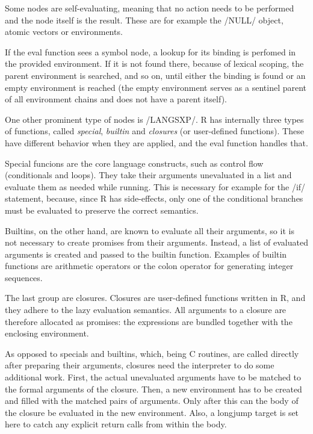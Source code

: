 {Some nodes are self-evaluating, meaning that no action needs to be performed and the node itself is the result. These are for example the \rinline/NULL/ object, atomic vectors or environments.

If the eval function sees a symbol node, a lookup for its binding is perfomed in the provided environment. If it is not found there, because of lexical scoping, the parent environment is searched, and so on, until either the binding is found or an empty environment is reached (the empty environment serves as a sentinel parent of all environment chains and does not have a parent itself).

One other prominent type of nodes is \cinline/LANGSXP/. R has internally three types of functions, called \emph{special}, \emph{builtin} and \emph{closures} (or user-defined functions). These have different behavior when they are applied, and the eval function handles that.

Special funcions are the core language constructs, such as control flow (conditionals and loops). They take their arguments unevaluated in a list and evaluate them as needed while running. This is necessary for example for the \rinline/if/ statement, because, since R has side-effects, only one of the conditional branches must be evaluated to preserve the correct semantics.


Builtins, on the other hand, are known to evaluate all their arguments, so it is not necessary to create promises from their arguments. Instead, a list of evaluated arguments is created and passed to the builtin function. Examples of builtin functions are arithmetic operators or the colon operator for generating integer sequences.

The last group are closures. Closures are user-defined functions written in R, and they adhere to the lazy evaluation semantics. All arguments to a closure are therefore allocated as promises: the expressions are bundled together with the enclosing environment.

As opposed to specials and builtins, which, being C routines, are called directly after preparing their arguments, closures need the interpreter to do some additional work. First, the actual unevaluated arguments have to be matched to the formal arguments of the closure. Then, a new environment has to be created and filled with the matched pairs of arguments. Only after this can the body of the closure be evaluated in the new environment. Also, a longjump target is set here to catch any explicit return calls from within the body.

}
